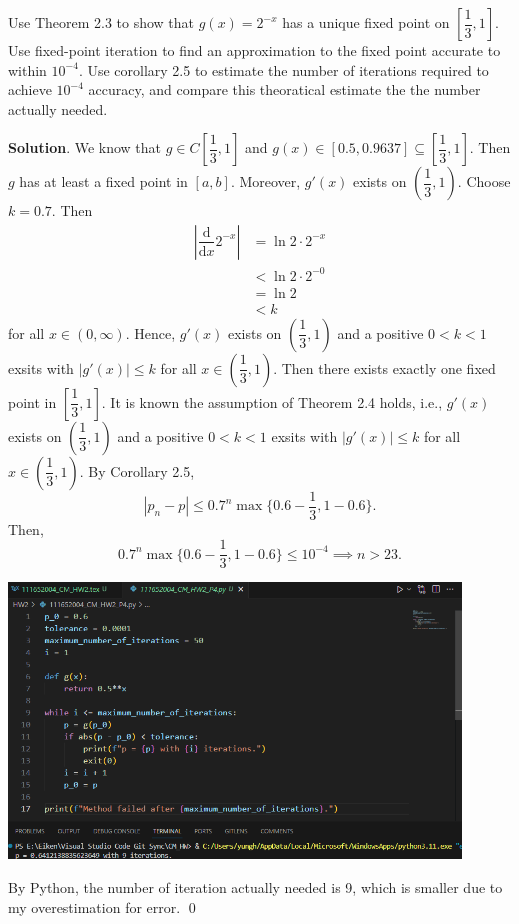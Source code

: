 \documentclass[11pt]{article}
\theoremstyle{break}
\newcommand{\dd}{\text{d}}
\numberwithin{equation}{theorem}
\begin{document}
\newpage
\begin{problem}\label{problem 4}
    Use Theorem 2.3 to show that $g(x)=2^{-x}$ has a unique fixed point on $\left[\dfrac{1}{3}, 1\right]$. Use fixed-point iteration to find an approximation to the fixed point accurate to within $10^{-4}$. Use corollary 2.5 to estimate the number of iterations required to achieve $10^{-4}$ accuracy, and compare this theoratical estimate the the number actually needed.
\end{problem}
\textbf{Solution}. We know that $g\in C\left[\dfrac{1}{3}, 1\right]$ and $g(x)\in[0.5, 0.9637]\subseteq\left[\dfrac{1}{3}, 1\right]$. Then $g$ has at least a fixed point in $[a, b]$. Moreover, $g'(x)$ exists on $\left(\dfrac{1}{3}, 1\right)$. Choose $k=0.7$. Then
\begin{align*}
    \left|\dfrac{\dd}{\dd x}2^{-x}\right|&=\ln2\cdot 2^{-x}\\
    &<\ln2\cdot 2^{-0}\\
    &=\ln2\\
    &<k
\end{align*}
for all $x\in(0, \infty)$. Hence, $g'(x)$ exists on $\left(\dfrac{1}{3}, 1\right)$ and a positive $0<k<1$ exsits with $\left|g'(x)\right|\leq k$ for all $x\in\left(\dfrac{1}{3}, 1\right)$. Then there exists exactly one fixed point in $\left[\dfrac{1}{3}, 1\right]$. It is known the assumption of Theorem 2.4 holds, i.e., $g'(x)$ exists on $\left(\dfrac{1}{3}, 1\right)$ and a positive $0<k<1$ exsits with $\left|g'(x)\right|\leq k$ for all $x\in\left(\dfrac{1}{3}, 1\right)$. By Corollary 2.5, 
\begin{equation*}
    |p_n-p|\leq 0.7^n\max\{0.6-\dfrac{1}{3}, 1-0.6\}.
\end{equation*}
Then,
\begin{equation*}
    0.7^n\max\{0.6-\dfrac{1}{3}, 1-0.6\}\leq 10^{-4} \implies n>23.
\end{equation*}

\begin{center}
    \includegraphics[width=0.9\textwidth]{problem_4_py.png}
\end{center}
By Python, the number of iteration actually needed is 9, which is smaller due to my overestimation for error. \qed
\end{document}
